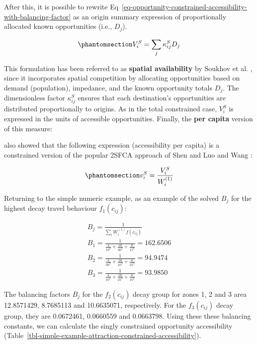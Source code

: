 \documentclass[
  10pt,
  letterpaper,
]{article}
\begin{document}
After this, it is possible to rewrite
Eq~\ref{eq-opportunity-constrained-accessibility-with-balancing-factor}
as an origin summary expression of proportionally allocated known
opportunities (i.e., \(D_j\)).

\begin{equation}\phantomsection\label{eq-attraction-constrained-accessibility-with-proportional-allocation-factor}{
V^S_{i} = \sum_j \kappa^S_{ij} D_j
}\end{equation}

This formulation has been referred to as \textbf{spatial availability}
by Soukhov et al. \citep{soukhovIntroducingSpatialAvailability2023},
since it incorporates spatial competition by allocating opportunities
based on demand (population), impedance, and the known opportunity
totals \(D_j\). The dimensionless factor \(\kappa^S_{ij}\) ensures that
each destination's opportunities are distributed proportionally to
origins. As in the total constrained case, \(V_i^S\) is expressed in the
units of accessible opportunities. Finally, the \textbf{per capita}
version of this measure:

\citet{soukhovIntroducingSpatialAvailability2023} also showed that the
following expression (accessibility per capita) is a constrained version
of the popular 2SFCA approach of Shen \citep{shen1998} and Luo and Wang
\citep{luo2003}:

\begin{equation}\phantomsection\label{eq-opportunity-constrained-accessibility-per-capita}{
v^S_{i} = \frac{V^S_{i}}{W^{(1)}_i}
}\end{equation}

Returning to the simple numeric example, as an example of the solved
\(B_{j}\) for the highest decay travel behaviour \(f_1(c_{ij})\):

\[
\begin{array}{l}
B_{j} = \frac{1}{\sum_i W_i^{(1)} f(c_{ij})}\\
B_{1} =  \frac{1}{\frac{4}{10^3} + \frac{10}{30^3} + \frac{6}{15^3}} = 162.6506\\ 
B_{2} =  \frac{1}{\frac{4}{30^3} + \frac{10}{10^3} + \frac{6}{25^3}} = 94.9474\\
B_{3} =  \frac{1}{\frac{4}{10^3} + \frac{10}{25^3} + \frac{6}{10^3}} = 93.9850
\end{array}
\]

The balancing factors \(B_j\) for the \(f_2(c_{ij})\) decay group for
zones 1, 2 and 3 area 12.8571429, 8.7685113 and 10.6635071,
respectively. For the \(f_3(c_{ij})\) decay group, they are 0.0672461,
0.0660559 and 0.0663798. Using these these balancing constants, we can
calculate the singly constrained opportunity accessibility
(Table~\ref{tbl-simple-example-attraction-constrained-accessibility}).
\end{document}
